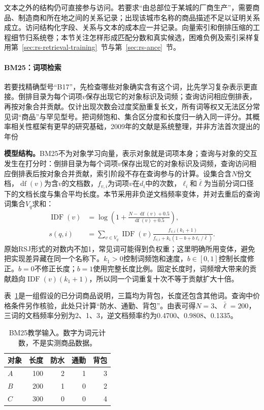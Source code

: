 文本之外的结构仍可直接参与访问。若要求“由总部位于某城的厂商生产”，需要商品、制造商和所在地之间的关系记录；出现该城市名称的商品描述不足以证明关系成立。访问结构化字段、关系与文本的成本应一并记录。向量索引和倒排压缩的工程细节归系统卷；本节关注怎样形成匹配分数和真实候选，困难负例及索引采样复用第~\ref{sec:rs-retrieval-training}~节与第~\ref{sec:rs-ance}~节。

\Needspace{100mm}
\paragraph{BM25：词项检索}
\label{sec:rs-search-bm25}

若要找精确型号“B17”，先检查哪些对象确实含有这个词，比先学习复杂表示更直接。倒排目录为每个词项$v$保存出现它的对象标识及词频；查询访问相应倒排表，再按对象合并贡献。仅计出现次数会过度奖励重复长文，所有词等权又无法区分常见词“商品”与罕见型号。把词频饱和、集合区分度和长度归一纳入同一评分。其概率相关性框架有更早的研究基础，2009年的文献是系统整理，并非方法首次提出的年份

\textbf{模型结构。}BM25不为对象学习向量，表示对象就是词项本身；查询与对象的交互发生在打分时：倒排目录为每个词项$v$保存出现它的对象标识及词频，查询访问相应倒排表后按对象合并贡献，索引阶段不存在查询参与的计算。设集合含$N$份文档，$\operatorname{df}(v)$为含$v$的文档数，$f_{v,i}$为词项$v$在$d_i$中的次数，$\ell_i$和$\bar\ell$为当前分词口径下的文档长度与集合平均长度。本节采用非负逆文档频率变体，并对去重后的查询词集合$V_q$求和：
\begin{equation}
 \begin{split}
 \operatorname{IDF}(v)&=\log\left(1+\frac{N-\operatorname{df}(v)+0.5}
                                      {\operatorname{df}(v)+0.5}\right),\\
 s(q,i)&=\sum_{v\in V_q}\operatorname{IDF}(v)
 \frac{f_{v,i}(k_1+1)}
 {f_{v,i}+k_1(1-b+b\ell_i/\bar\ell)} .
 \end{split}
 \label{eq:rs-search-bm25}
\end{equation}
原始RSJ形式的对数内不加1，常见词可能得到负权重；这里明确所用变体，避免把实现差异藏在同一个名称下。$k_1>0$控制词频饱和速度，$b\in[0,1]$控制长度修正。$b=0$不修正长度；$b=1$使用完整长度比例。固定长度时，词频增大带来的贡献趋向$\operatorname{IDF}(v)(k_1+1)$，所以同一个词重复十次不等于贡献扩大十倍。

表~\ref{tab:rs-search-bm25-example}是一组假设的已分词商品说明，三篇均为背包，长度还包含其他词。查询中价格条件另作核验，此处只计算“防水、通勤、背包”。由表可得$N=3$、$\bar\ell=200$，三词的文档频率分别为2、1、3，逆文档频率约为0.4700、0.9808、0.1335。
\begin{table}[htbp]
 \centering
 \begin{tabular}{lrrrr}
  \toprule
  对象 & 长度 & 防水 & 通勤 & 背包 \\
  \midrule
  $A$ & 100 & 2 & 1 & 3 \\
  $B$ & 200 & 1 & 0 & 2 \\
  $C$ & 300 & 0 & 0 & 4 \\
  \bottomrule
 \end{tabular}
 \caption{BM25教学输入。数字为词元计数，不是实测商品数据。}
 \label{tab:rs-search-bm25-example}
\end{table}

